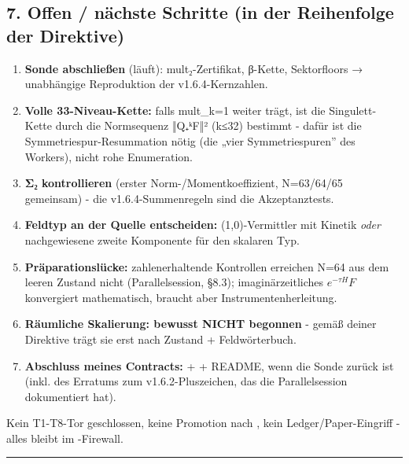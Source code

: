 \subsection{7. Offen / nächste Schritte (in der Reihenfolge der
Direktive)}\label{offen-nuxe4chste-schritte-in-der-reihenfolge-der-direktive}

\begin{enumerate}
\def\labelenumi{\arabic{enumi}.}
\tightlist
\item
  \textbf{Sonde abschließen} (läuft): mult₂-Zertifikat, β-Kette,
  Sektorfloors → unabhängige Reproduktion der v1.6.4-Kernzahlen.
\item
  \textbf{Volle 33-Niveau-Kette:} falls mult\_k=1 weiter trägt, ist die
  Singulett-Kette durch die Normsequenz ‖Q₊ᵏF‖² (k≤32) bestimmt - dafür
  ist die Symmetriespur-Resummation nötig (die „vier Symmetriespuren''
  des Workers), nicht rohe Enumeration.
\item
  \textbf{Σ₂ kontrollieren} (erster Norm-/Momentkoeffizient, N=63/64/65
  gemeinsam) - die v1.6.4-Summenregeln sind die Akzeptanztests.
\item
  \textbf{Feldtyp an der Quelle entscheiden:} (1,0)-Vermittler mit
  Kinetik \emph{oder} nachgewiesene zweite Komponente für den skalaren
  Typ.
\item
  \textbf{Präparationslücke:} zahlenerhaltende Kontrollen erreichen N=64
  aus dem leeren Zustand nicht (Parallelsession, §8.3);
  imaginärzeitliches \(e^{-\tau H}F\) konvergiert mathematisch, braucht
  aber Instrumentenherleitung.
\item
  \textbf{Räumliche Skalierung: bewusst NICHT begonnen} - gemäß deiner
  Direktive trägt sie erst nach Zustand + Feldwörterbuch.
\item
  \textbf{Abschluss meines Contracts:}  +
   + README, wenn die Sonde zurück ist (inkl. des
  Erratums zum v1.6.2-Pluszeichen, das die Parallelsession dokumentiert
  hat).
\end{enumerate}

Kein T1-T8-Tor geschlossen, keine Promotion nach
, kein Ledger/Paper-Eingriff - alles bleibt im
-Firewall.

\begin{center}\rule{0.5\linewidth}{0.5pt}\end{center}

